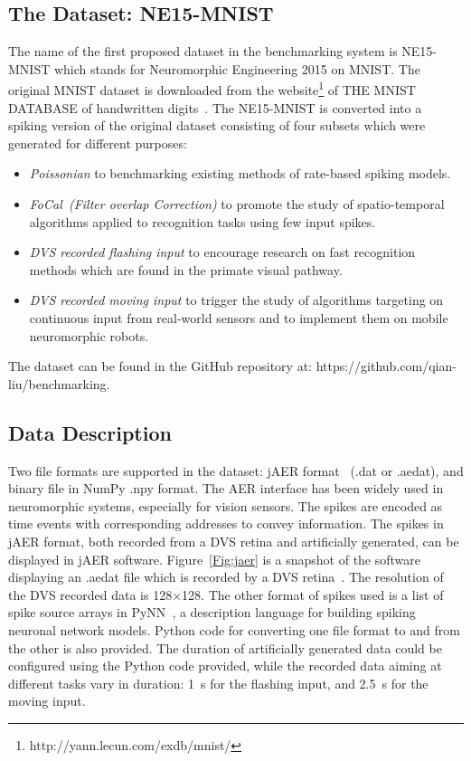 \documentclass{frontiersENG} %
\begin{document}
\subsection{The Dataset: NE15-MNIST}
\label{sec:data}
The name of the first proposed dataset in the benchmarking system is NE15-MNIST which stands for Neuromorphic Engineering 2015 on MNIST.
The original MNIST dataset is downloaded from the website\footnote{http://yann.lecun.com/exdb/mnist/} of THE MNIST DATABASE of handwritten digits~\citep{lecun1998gradient}.
The NE15-MNIST is converted into a spiking version of the original dataset consisting of four subsets which were generated for different purposes:
\begin{itemize}
	\item \textit{Poissonian}
	to benchmarking existing methods of rate-based spiking models.
	\item \textit{FoCal~(Filter overlap Correction)}
	to promote the study of spatio-temporal algorithms applied to recognition tasks using few input spikes.
	\item \textit{DVS recorded flashing input}
	to encourage research on fast recognition methods which are found in the primate visual pathway.
	\item \textit{DVS recorded moving input}
	to trigger the study of algorithms targeting on continuous input from real-world sensors and to implement them on mobile neuromorphic robots.
\end{itemize}
The dataset can be found in the GitHub repository at: https://github.com/qian-liu/benchmarking.
\subsection{Data Description}

Two file formats are supported in the dataset: jAER format~\citep{delbruck2008frame} (.dat or .aedat), and binary file in NumPy .npy format.
The AER interface has been widely used in neuromorphic systems, especially for vision sensors.
The spikes are encoded as time events with corresponding addresses to convey information.
The spikes in jAER format, both recorded from a DVS retina and artificially generated, can be displayed in jAER software.
Figure~\ref{Fig:jaer} is a snapshot of the software displaying an .aedat file which is recorded by a DVS retina~\citep{serrano2013128}.
The resolution of the DVS recorded data is 128$\times$128.
The other format of spikes used is a list of spike source arrays in PyNN~\citep{davison2008pynn}, a description language for building spiking neuronal network models.
Python code for converting one file format to and from the other is also provided.
The duration of artificially generated data could be configured using the Python code provided, while the recorded data aiming at different tasks vary in duration: 1~s for the flashing input, and 2.5~s for the moving input.
\end{document}
